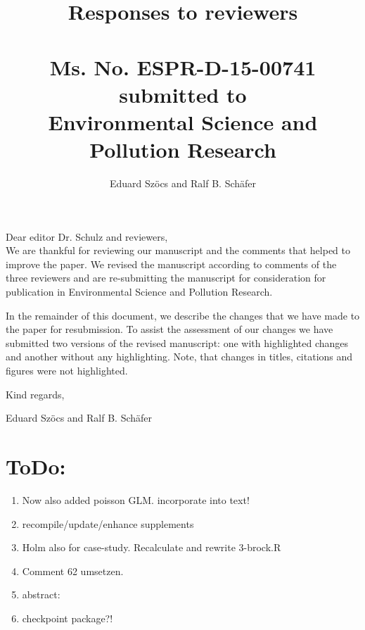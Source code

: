 \documentclass[12pt]{article}
\begin{document}
\title{Responses to reviewers\\~\\Ms. No. ESPR-D-15-00741\\submitted to\\Environmental Science and Pollution Research}

\author{Eduard Szöcs and Ralf B. Schäfer}

\maketitle
\noindent Dear editor Dr. Schulz  and reviewers,\\

We are thankful for reviewing our manuscript and the comments that helped to improve the paper. 
We revised the manuscript according to comments of the three reviewers and are re-submitting the manuscript for consideration for publication in Environmental Science and Pollution Research. 

In the remainder of this document, we describe the changes that we have made to the paper for resubmission. 
To assist the assessment of our changes we have submitted two versions of the revised manuscript: one with highlighted changes and another without any highlighting. 
Note, that changes in titles, citations and figures were not highlighted.

\vspace{2em}
\hfill Kind regards,

\hfill Eduard Szöcs and Ralf B. Schäfer

\newpage
\section{ToDo:}
\begin{enumerate}
	\item Now also added poisson GLM. incorporate into text!
	\item recompile/update/enhance supplements
	\item Holm also for case-study. Recalculate and rewrite 3-brock.R
	\item Comment 62 umsetzen.
	\item abstract: 
	\item checkpoint package?!
\end{enumerate}


\end{document}
